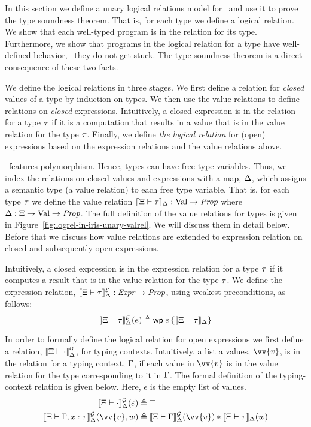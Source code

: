 
In this section we define a unary logical relations model for
\TheLang\, and use it to prove the type soundness theorem.  That is,
for each type we define a logical relation. We show that each
well-typed program is in the relation for its type. Furthermore, we
show that programs in the logical relation for a type have
well-defined behavior, \ie\ they do not get stuck. The type soundness
theorem is a direct consequence of these two facts.

We define the logical relations in three stages. We first define a
relation for \emph{closed} values of a type by induction on types. We
then use the value relations to define relations on \emph{closed}
expressions. Intuitively, a closed expression is in the relation for a
type $\tau$ if it is a computation that results in a value that is in
the value relation for the type $\tau$. Finally, we define \emph{the
  logical relation} for (open) expressions based on the expression
relations and the value relations above.

\TheLang\, features polymorphism. Hence, types can have free type
variables. Thus, we index the relations on closed values and
expressions with a map, $\Delta$, which assigns a semantic type (a
value relation) to each free type variable. That is, for each type
$\tau$ we define the value relation
$\llbracket \Xi \vdash \tau \rrbracket_{\Delta} : \text{Val} \to \textit{Prop}$ where
$\Delta : \Xi \to \text{Val} \to \textit{Prop}$. The full definition of the
value relations for types is given in
Figure~\ref{fig:logrel-in-iris-unary-valrel}. We will discuss them in
detail below. Before that we discuss how value relations are extended
to expression relation on closed and subsequently open expressions.

Intuitively, a closed expression is in the expression relation for a
type $\tau$ if it computes a result that is in the value relation for
the type $\tau$. We define the expression relation,
$\llbracket \Xi \vdash \tau \rrbracket^{\mathcal{E}}_{\Delta} : \kern-0.05em\textit{Expr} \to \textit{Prop}$, using 
weakest preconditions, as follows:
\[
\semEtype{\Tenv}{\typ}{\semenv}(\expr) \eqdef{} \wpre{\expr}{\semVtype{\Tenv}{\typ}{\semenv}}
\]

In order to formally define the logical relation for open expressions
we first define a relation, $\llbracket \Xi \vdash \cdot \rrbracket^{\mathcal{G}}_{\Delta}$, for
typing contexts. Intuitively, a list a values, $\vv{\val}$, is in the
relation for a typing context, $\Gamma$, if each value in $\vv{\val}$ is
in the value relation for the type corresponding to it in $\Gamma$. The
formal definition of the typing-context relation is given below. Here,
$\epsilon$ is the empty list of values.
\begin{align*}
  \semGtype{\Tenv}{\cdot}{\semenv}(\epsilon) \eqdef{}
  & \top\\
  \semGtype{\Tenv}{\env, \var : \typ}{\semenv}(\vv{\val}, \valB) \eqdef{}
  & \semGtype{\Tenv}{\env}{\semenv}(\vv{\val}) \ast
    \semVtype{\Tenv}{\typ}{\semenv}(\valB)
\end{align*}

